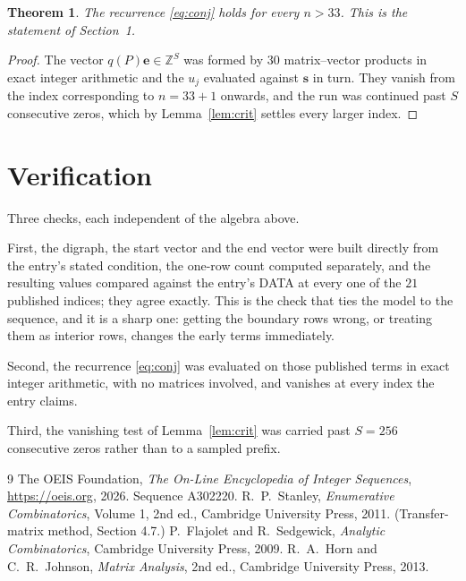 \documentclass[11pt,a4paper]{article}
\theoremstyle{plain}
\newtheorem{theorem}{Theorem}
\theoremstyle{definition}
\begin{document}
\begin{theorem}
The recurrence \eqref{eq:conj} holds for every $n>33$. This is the statement of
Section~1.
\end{theorem}

\begin{proof}
The vector $q(P)\mathbf{e}\in\mathbb{Z}^{S}$ was formed by $30$ matrix--vector
products in exact integer arithmetic and the $u_j$ evaluated against $\mathbf{s}$ in turn.
They vanish from the index corresponding to $n=33+1$ onwards, and the run was continued
past $S$ consecutive zeros, which by Lemma~\ref{lem:crit} settles every larger index.
\end{proof}

\section{Verification}

Three checks, each independent of the algebra above.

First, the digraph, the start vector and the end vector were built directly from the
entry's stated condition, the one-row count computed separately, and the resulting values
compared against the entry's DATA at every one of the $21$ published indices; they
agree exactly. This is the check that ties the model to the sequence, and it is a sharp one:
getting the boundary rows wrong, or treating them as interior rows, changes the early terms
immediately.

Second, the recurrence \eqref{eq:conj} was evaluated on those published terms in exact
integer arithmetic, with no matrices involved, and vanishes at every index the entry claims.

Third, the vanishing test of Lemma~\ref{lem:crit} was carried past $S=256$ consecutive
zeros rather than to a sampled prefix.

\begin{thebibliography}{9}
 The OEIS Foundation, \emph{The On-Line Encyclopedia of Integer
Sequences}, \url{https://oeis.org}, 2026. Sequence A302220.
 R.~P.~Stanley, \emph{Enumerative Combinatorics}, Volume 1, 2nd ed.,
Cambridge University Press, 2011. (Transfer-matrix method, Section 4.7.)
 P.~Flajolet and R.~Sedgewick, \emph{Analytic Combinatorics}, Cambridge
University Press, 2009.
 R.~A.~Horn and C.~R.~Johnson, \emph{Matrix Analysis}, 2nd ed., Cambridge
University Press, 2013.
\end{thebibliography}
\end{document}

